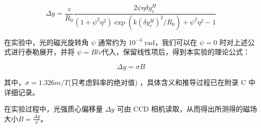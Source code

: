 \documentclass[12pt]{ctexart}
\numberwithin{equation}{section} %
\begin{document}
$$
\Delta y = \frac{z}{R_0} \frac{2\psi\eta \delta y_{r}^{H}}{(1+\psi^2 \eta^2) \exp\left(k(\delta y_{r}^{H})^2/R_0\right) + \psi^2 \eta^2 - 1}
$$

在实验中，光的磁光旋转角 $\psi$ 通常约为 $10^{-4} \text{ rad}$，我们可以在 $\psi = 0$ 时对上述公式进行泰勒展开，并将 $\psi =Blv$代入，保留线性项后，得到本实验的理论公式：

\begin{equation}
\Delta y = \sigma B
\label{eq:理论公式}
\end{equation}

其中，$\sigma=1.326 m/T$(只考虑斜率的绝对值) ，具体含义和推导过程已在附录 C 中详细记录。

在实验过程中，光强质心偏移量 $\Delta y$ 可由 CCD 相机读取，从而得出所测得的磁场大小$B=\frac{\Delta y}{\sigma}$。






















\end{document}

